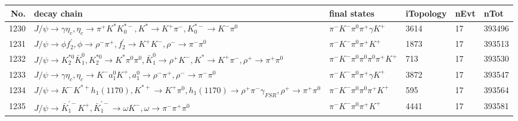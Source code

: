 \begin{table}[htbp] 
\begin{center}
\begin{small}
\begin{tabular}{rlllll}\hline\hline
 No. & decay chain & final states &  iTopology & nEvt & nTot \\\hline
1230&$J/\psi       \rightarrow \gamma       \eta_{c}    , \eta_{c}     \rightarrow \pi^{+}        K^{*}          K_{0}^{*-}     , K^{*}           \rightarrow K^{+}          \pi^{-}        , K_{0}^{*-}      \rightarrow K^{-}          \pi^{0}        $&$\pi^{-}        K^{-}          \pi^{0}        \pi^{+}        \gamma       K^{+}          $& 3614&   17&393496\\
1231&$J/\psi       \rightarrow \phi           f_2^{'}       , \phi            \rightarrow \rho^{-}      \pi^{+}        , f_2^{'}        \rightarrow K^{+}          K^{-}          , \rho^{-}       \rightarrow \pi^{-}        \pi^{0}        $&$\pi^{-}        K^{-}          \pi^{0}        \pi^{+}        K^{+}          $& 1873&   17&393513\\
1232&$J/\psi       \rightarrow K_2^{*0}       \bar{K}_1^{0} , K_2^{*0}        \rightarrow K^{*}          \pi^{0}        \pi^{0}        , \bar{K}_1^{0}  \rightarrow \rho^{+}      K^{-}          , K^{*}           \rightarrow K^{+}          \pi^{-}        , \rho^{+}       \rightarrow \pi^{+}        \pi^{0}        $&$\pi^{-}        K^{-}          \pi^{0}        \pi^{0}        \pi^{0}        \pi^{+}        K^{+}          $&  713&   17&393530\\
1233&$J/\psi       \rightarrow \gamma       \eta_{c}    , \eta_{c}     \rightarrow K^{-}          a_{1}^{0}      K^{+}          , a_{1}^{0}       \rightarrow \rho^{-}      \pi^{+}        , \rho^{-}       \rightarrow \pi^{-}        \pi^{0}        $&$\pi^{-}        K^{-}          \pi^{0}        \pi^{+}        \gamma       K^{+}          $& 3872&   17&393547\\
1234&$J/\psi       \rightarrow K^{-}          K^{*+}         h_{1}(1170)    , K^{*+}          \rightarrow K^{+}          \pi^{0}        , h_{1}(1170)     \rightarrow \rho^{+}      \pi^{-}        \gamma_{FSR} , \rho^{+}       \rightarrow \pi^{+}        \pi^{0}        $&$\pi^{-}        K^{-}          \pi^{0}        \pi^{0}        \pi^{+}        K^{+}          $&  595&   17&393564\\
1235&$J/\psi       \rightarrow \bar{K}_1^{'-}K^{+}          , \bar{K}_1^{'-} \rightarrow \omega         K^{-}          , \omega          \rightarrow \pi^{-}        \pi^{+}        \pi^{0}        $&$\pi^{-}        K^{-}          \pi^{0}        \pi^{+}        K^{+}          $& 4441&   17&393581\\

\end{tabular}
\end{small}
\end{center}
\end{table}
